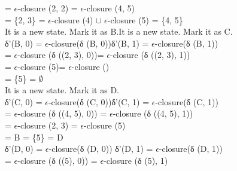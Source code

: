 \documentclass[10pt,a4paper]{book}
\begin{document}
\hspace*{1.2cm} = $\epsilon$-closure (2, 2)\hspace*{3.7cm} = $\epsilon$-closure (4, 5)\\
\hspace*{1.2cm} = \{2, 3\}\hspace*{3.3cm} = $\epsilon$-closure (4) $\cup$ $\epsilon$-closure (5) = \{4, 5\}\\
It is a new state. Mark it as B.\hspace*{2.5cm}It is a new state. Mark it as C.\\
δ'(B, 0) = $\epsilon$-closure(δ (B, 0))\hspace*{2cm}δ'(B, 1) = $\epsilon$-closure(δ (B, 1))\\
 \hspace*{1.3cm}= $\epsilon$-closure (δ ((2, 3), 0))\hspace*{2.6cm}= $\epsilon$-closure (δ ((2, 3), 1))\\
 \hspace*{1.3cm}= $\epsilon$-closure (5)\hspace*{4.2cm}= $\epsilon$-closure ()\\
 \hspace*{1.3cm}= \{5\}\hspace*{5.9cm} = $\emptyset$\\
It is a new state. Mark it as D.\\
δ'(C, 0) = $\epsilon$-closure(δ (C, 0))\hspace*{2cm}δ'(C, 1) = $\epsilon$-closure(δ (C, 1))\\
 \hspace*{1.3cm}= $\epsilon$-closure (δ ((4, 5), 0))\hspace*{2.5cm} = $\epsilon$-closure (δ ((4, 5), 1))\\
 \hspace*{1.3cm}= $\epsilon$-closure (2, 3)\hspace*{3.7cm} = $\epsilon$-closure (5)\\
 \hspace*{1.3cm}= B\hspace*{5.8cm} = \{5\} = D\\
δ'(D, 0) = $\epsilon$-closure(δ (D, 0)) \hspace*{1.8cm}δ'(D, 1) = $\epsilon$-closure(δ (D, 1))\\
 \hspace*{1.2cm} = $\epsilon$-closure (δ ((5), 0)) \hspace*{2.8cm}= $\epsilon$-closure (δ (5), 1)\\
\end{document}
